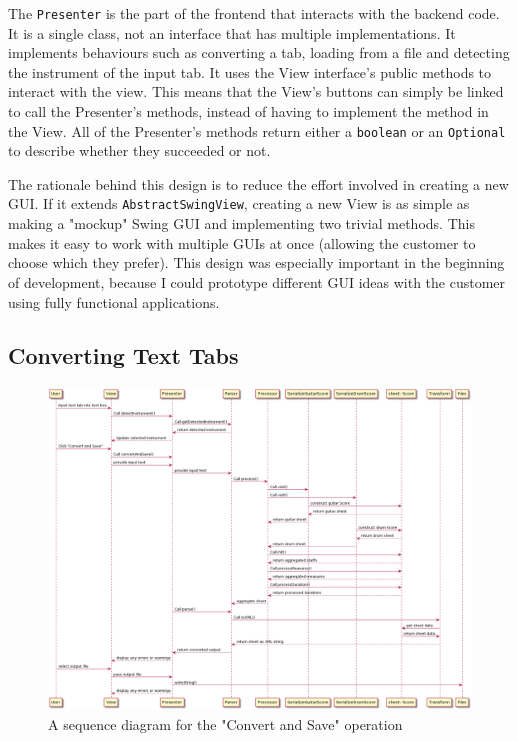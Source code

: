 \documentclass[11pt]{article}
\begin{document}
The \texttt{Presenter} is the part of the frontend that interacts with the backend code.  It is a single class, not an interface that has multiple implementations.  It implements behaviours such as converting a tab, loading from a file and detecting the instrument of the input tab.  It uses the View interface's public methods to interact with the view.  This means that the View's buttons can simply be linked to call the Presenter's methods, instead of having to implement the method in the View.  All of the Presenter's methods return either a \texttt{boolean} or an \texttt{Optional} to describe whether they succeeded or not.

The rationale behind this design is to reduce the effort involved in creating a new GUI.  If it extends \texttt{AbstractSwingView}, creating a new View is as simple as making a "mockup" Swing GUI and implementing two trivial methods.  This makes it easy to work with multiple GUIs at once (allowing the customer to choose which they prefer).  This design was especially important in the beginning of development, because I could prototype different GUI ideas with the customer using fully functional applications.
\subsection{Converting Text Tabs}
\label{sec:orgef2258e}
\begin{figure}[htbp]
\centering
\includegraphics[width=.9\linewidth]{./Diagrams/convert-and-save-2.png}
\caption{A sequence diagram for the "Convert and Save" operation}
\end{figure}
\end{document}
